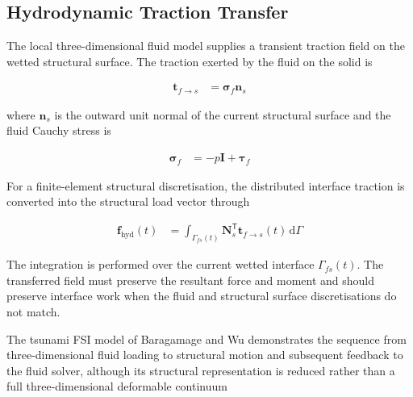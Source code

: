 

\subsection{Hydrodynamic Traction Transfer}
\label{subsec:res_str_lod_hydrodynamic_traction_transfer}

The local three-dimensional fluid model supplies a transient traction field on the wetted structural surface. The traction exerted by the fluid on the solid is

\begin{align}
\bm{t}_{f\rightarrow s}
&=
\bm{\sigma}_{f}\bm{n}_{s}
\label{eq:res_str_lod_fluid_traction}
\end{align}

where \(\bm{n}_{s}\) is the outward unit normal of the current structural surface and the fluid Cauchy stress is

\begin{align}
\bm{\sigma}_{f}
&=
-p\bm{I}+\bm{\tau}_{f}
\label{eq:res_str_lod_fluid_cauchy_stress}
\end{align}

For a finite-element structural discretisation, the distributed interface traction is converted into the structural load vector through

\begin{align}
\bm{f}_{\mathrm{hyd}}(t)
&=
\int_{\Gamma_{fs}(t)}
\bm{N}_{s}^{\mathsf{T}}
\bm{t}_{f\rightarrow s}(t)
\,\mathrm{d}\Gamma
\label{eq:res_str_lod_hydrodynamic_load_vector}
\end{align}

The integration is performed over the current wetted interface \(\Gamma_{fs}(t)\). The transferred field must preserve the resultant force and moment and should preserve interface work when the fluid and structural surface discretisations do not match.

The tsunami FSI model of Baragamage and Wu demonstrates the sequence from three-dimensional fluid loading to structural motion and subsequent feedback to the fluid solver, although its structural representation is reduced rather than a full three-dimensional deformable continuum \autocite{baragamage2024}

